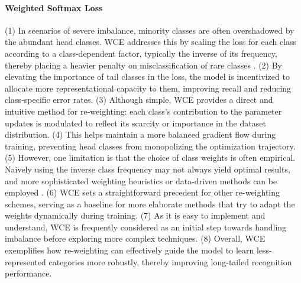  \paragraph{Weighted Softmax Loss}
 (1) In scenarios of severe imbalance, minority classes are often overshadowed by the abundant head classes. WCE addresses this by scaling the loss for each class according to a class-dependent factor, typically the inverse of its frequency, thereby placing a heavier penalty on misclassification of rare classes \cite{zhang2023deep}.
(2) By elevating the importance of tail classes in the loss, the model is incentivized to allocate more representational capacity to them, improving recall and reducing class-specific error rates.
(3) Although simple, WCE provides a direct and intuitive method for re-weighting: each class’s contribution to the parameter updates is modulated to reflect its scarcity or importance in the dataset distribution.
(4) This helps maintain a more balanced gradient flow during training, preventing head classes from monopolizing the optimization trajectory.
(5) However, one limitation is that the choice of class weights is often empirical. Naively using the inverse class frequency may not always yield optimal results, and more sophisticated weighting heuristics or data-driven methods can be employed \cite{zhang2023deep}.
(6) WCE sets a straightforward precedent for other re-weighting schemes, serving as a baseline for more elaborate methods that try to adapt the weights dynamically during training.
(7) As it is easy to implement and understand, WCE is frequently considered as an initial step towards handling imbalance before exploring more complex techniques.
(8) Overall, WCE exemplifies how re-weighting can effectively guide the model to learn less-represented categories more robustly, thereby improving long-tailed recognition performance.

